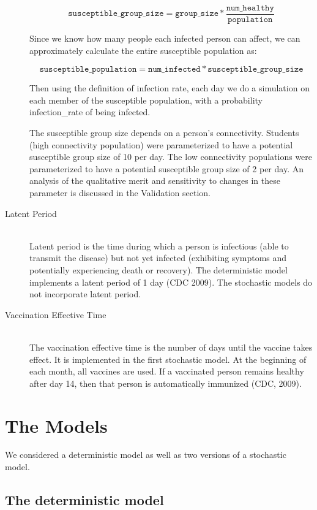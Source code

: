 \documentclass[titlepage]{article}
\begin{document}
\begin{description}
$$\texttt{susceptible\_group\_size} = \texttt{group\_size} * \frac{\texttt{num\_healthy}}{\texttt{population}}$$

Since we know how many people each infected person can affect, we can approximately calculate the entire susceptible population as:

$$\texttt{susceptible\_population} =\texttt{num\_infected} * \texttt{susceptible\_group\_size}$$

Then using the definition of infection rate, each day we do a simulation on each member of the susceptible population, with a probability infection\_rate of being infected.

The susceptible group size depends on a person's connectivity. Students (high connectivity population) were parameterized to have a potential susceptible group size of 10 per day. The low connectivity populations were parameterized to have a potential susceptible group size of 2 per day. An analysis of the qualitative merit and sensitivity to changes in these parameter is discussed in the Validation section.

\item[Latent Period]\hfill \\
Latent period is the time during which a person is infectious (able to transmit the disease) but not yet infected (exhibiting symptoms and potentially experiencing death or recovery). The deterministic model implements a latent period of 1 day (CDC 2009). The stochastic models do not incorporate latent period.


\item[Vaccination Effective Time]\hfill \\
The vaccination effective time is the number of days until the vaccine takes effect. It is implemented in the first stochastic model. At the beginning of each month, all vaccines are used. If a vaccinated person remains healthy after day 14, then that person is automatically immunized (CDC, 2009). 
\end{description}


\section{The Models}
We considered a deterministic model as well as two versions of a stochastic model.  

\subsection{The deterministic model}
\end{document}
